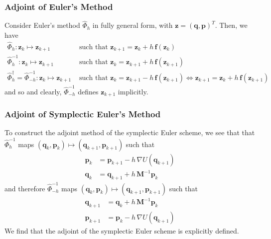     \subsubsection{Adjoint of Euler's Method}

      Consider Euler's method $\hat{\Phi}_{h}$ in fully general form, with $\mathbf{z} = (\mathbf{q}, \mathbf{p})^T$. Then, we have 
      \begin{align*}
        \hat{\Phi}_{h}: \mathbf{z}_k \mapsto \mathbf{z}_{k+1} & \text{ such that } \mathbf{z}_{k + 1} = \mathbf{z}_k + h \,\mathbf{f}( \mathbf{z}_k) \\
        \hat{\Phi}_{h}^{-1}: \mathbf{z}_k \mapsto \mathbf{z}_{k+1} & \text{ such that } \mathbf{z}_{k} = \mathbf{z}_{k+1} + h \,\mathbf{f}( \mathbf{z}_{k+1}) \\
        \hat{\Phi}_h^\dagger = \hat{\Phi}_{-h}^{-1}: \mathbf{z}_k \mapsto \mathbf{z}_{k+1} & \text{ such that } \mathbf{z}_{k} = \mathbf{z}_{k+1} - h \,\mathbf{f}( \mathbf{z}_{k+1}) \iff \mathbf{z}_{k+1} = \mathbf{z}_k + h\, \mathbf{f}(\mathbf{z}_{k+1}) 
      \end{align*}
      and so 
      and clearly, $\hat{\Phi}_{-h}^{-1}$ defines $\mathbf{z}_{k+1}$ implicitly. 

    \subsubsection{Adjoint of Symplectic Euler's Method}

      To construct the adjoint method of the symplectic Euler scheme, we see that that $\hat{\Phi}_{h}^{-1}$ maps $(\mathbf{q}_k, \mathbf{p}_k) \mapsto (\mathbf{q}_{k+1}, \mathbf{p}_{k+1})$ such that
      \begin{align*}
        \mathbf{p}_k & = \mathbf{p}_{k+1} - h \, \nabla U(\mathbf{q}_{k+1}) \\
        \mathbf{q}_k & = \mathbf{q}_{k+1} + h \, \mathbf{M}^{-1} \mathbf{p}_{k} 
      \end{align*}
      and therefore $\hat{\Phi}_{- h}^{-1}$ maps $(\mathbf{q}_k, \mathbf{p}_k) \mapsto (\mathbf{q}_{k+1}, \mathbf{p}_{k+1})$ such that
      \begin{align*}
        \mathbf{q}_{k+1} & = \mathbf{q}_k + h \, \mathbf{M}^{-1} \mathbf{p}_k \\
        \mathbf{p}_{k+1} & = \mathbf{p}_k - h \, \nabla U (\mathbf{q}_{k+1})
      \end{align*}
      We find that the adjoint of the symplectic Euler scheme is explicitly defined. 

